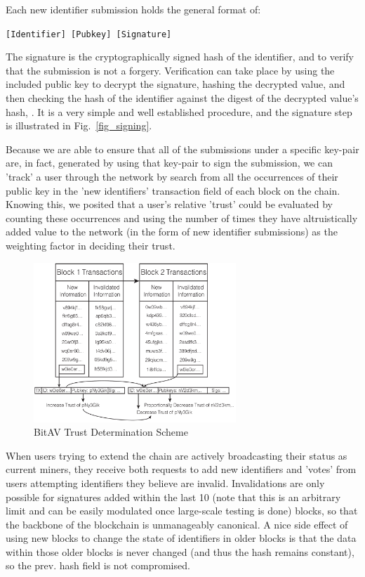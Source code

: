 \documentclass[12pt,journal]{IEEEtran}
\begin{document}
Each new identifier submission holds the general format of:\par

\texttt{[Identifier] [Pubkey] [Signature]}\par

The signature is the cryptographically signed hash of the identifier, and to verify that the submission is not a forgery. Verification can take place by using the included public key to decrypt the signature, hashing the decrypted value, and then checking the hash of the identifier against the digest of the decrypted value's hash\cite{Johnson2001}, \cite{Juels1997}. It is a very simple and well established  procedure, and the signature step is illustrated in Fig.~\ref{fig_signing}.\par

Because we are able to ensure that all of the submissions under a specific key-pair are, in fact, generated by using that key-pair to sign the submission, we can 'track' a user through the network by search from all the occurrences of their public key in the 'new identifiers' transaction field of each block on the chain. Knowing this, we posited that a user's relative 'trust' could be evaluated by counting these occurrences and using the number of times they have altruistically added value to the network (in the form of new identifier submissions) as the weighting factor in deciding their trust. \par

\begin{figure}[!t]
\centering
\includegraphics[width=3in]{figures/vector/trustVisual}
\caption{BitAV Trust Determination Scheme}
\label{fig_trst}
\end{figure}

When users trying to extend the chain are actively broadcasting their status as current miners, they receive both requests to add new identifiers and 'votes' from users attempting identifiers they believe are invalid. Invalidations are only possible for signatures added within the last 10 (note that this is an arbitrary limit and can be easily modulated once large-scale testing is done) blocks, so that the backbone of the blockchain is unmanageably canonical. A nice side effect of using new blocks to change the state of identifiers in older blocks is that the data within those older blocks is never changed (and thus the hash remains constant), so the prev. hash field is not compromised.\par
\end{document}

